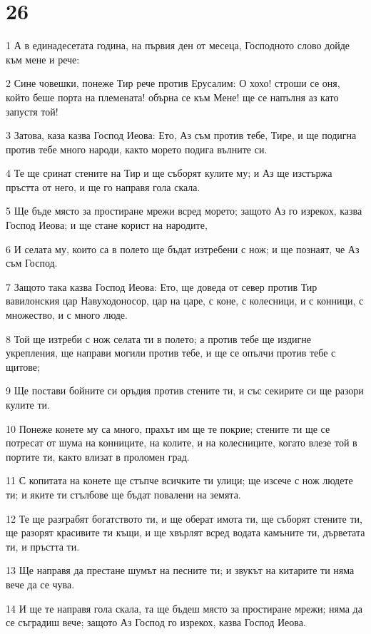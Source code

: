 \chapter{26}

\par 1 А в единадесетата година, на първия ден от месеца, Господното слово дойде към мене и рече:
\par 2 Сине човешки, понеже Тир рече против Ерусалим: О хохо! строши се оня, който беше порта на племената! обърна се към Мене! ще се напълня аз като запустя той!
\par 3 Затова, каза казва Господ Иеова: Ето, Аз съм против тебе, Тире, и ще подигна против тебе много народи, както морето подига вълните си.
\par 4 Те ще сринат стените на Тир и ще съборят кулите му; и Аз ще изстържа пръстта от него, и ще го направя гола скала.
\par 5 Ще бъде място за простиране мрежи всред морето; защото Аз го изрекох, казва Господ Иеова; и ще стане корист на народите,
\par 6 И селата му, които са в полето ще бъдат изтребени с нож; и ще познаят, че Аз съм Господ.
\par 7 Защото така казва Господ Иеова: Ето, ще доведа от север против Тир вавилонския цар Навуходоносор, цар на царе, с коне, с колесници, и с конници, с множество, и с много люде.
\par 8 Той ще изтреби с нож селата ти в полето; а против тебе ще издигне укрепления, ще направи могили против тебе, и ще се опълчи против тебе с щитове;
\par 9 Ще постави бойните си оръдия против стените ти, и със секирите си ще разори кулите ти.
\par 10 Понеже конете му са много, прахът им ще те покрие; стените ти ще се потресат от шума на конниците, на колите, и на колесниците, когато влезе той в портите ти, както влизат в проломен град.
\par 11 С копитата на конете ще стъпче всичките ти улици; ще изсече с нож людете ти; и яките ти стълбове ще бъдат повалени на земята.
\par 12 Те ще разграбят богатството ти, и ще оберат имота ти, ще съборят стените ти, ще разорят красивите ти къщи, и ще хвърлят всред водата камъните ти, дърветата ти, и пръстта ти.
\par 13 Ще направя да престане шумът на песните ти; и звукът на китарите ти няма вече да се чува.
\par 14 И ще те направя гола скала, та ще бъдеш място за простиране мрежи; няма да се съградиш вече; защото Аз Господ го изрекох, казва Господ Иеова.
